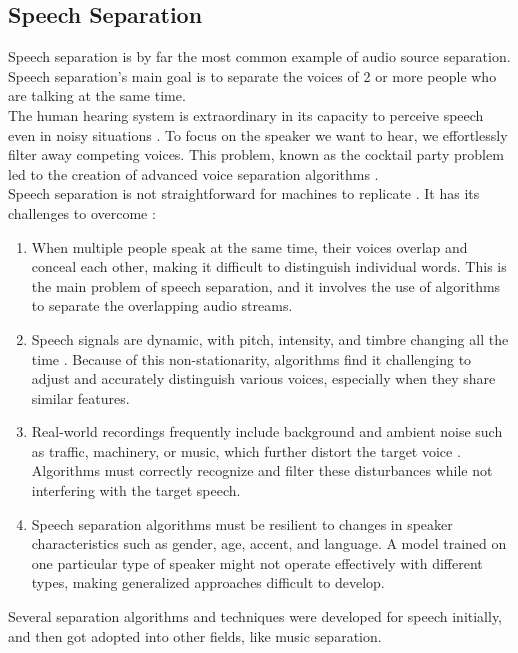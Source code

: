 \subsection{Speech Separation}
Speech separation is by far the most common example of audio source separation. Speech separation's main goal is to separate the voices of 2 or more people who are talking at the same time. \\
The human hearing system is extraordinary in its capacity to perceive speech even in noisy situations \cite{mesgarani2012}. To focus on the speaker we want to hear, we effortlessly filter away competing voices. This problem, known as the cocktail party problem led to the creation of advanced voice separation algorithms \cite{agrawal2023b}.\\
Speech separation is not straightforward for machines to replicate \cite{agrawal2023a}. It has its challenges to overcome \cite{agrawal2023b}:
\begin{enumerate}
    \item When multiple people speak at the same time, their voices overlap and conceal each other, making it difficult to distinguish individual words. This is the main problem of speech separation, and it involves the use of algorithms to separate the overlapping audio streams.
    \item Speech signals are dynamic, with pitch, intensity, and timbre changing all the time \cite{town2013}. Because of this non-stationarity, algorithms find it challenging to adjust and accurately distinguish various voices, especially when they share similar features.
    \item Real-world recordings frequently include background and ambient noise such as traffic, machinery, or music, which further distort the target voice \cite{lee2015}. Algorithms must correctly recognize and filter these disturbances while not interfering with the target speech.
    \item Speech separation algorithms must be resilient to changes in speaker characteristics such as gender, age, accent, and language. A model trained on one particular type of speaker might not operate effectively with different types, making generalized approaches difficult to develop.
\end{enumerate}
Several separation algorithms and techniques were developed for speech initially, and then got adopted into other fields, like music separation.

